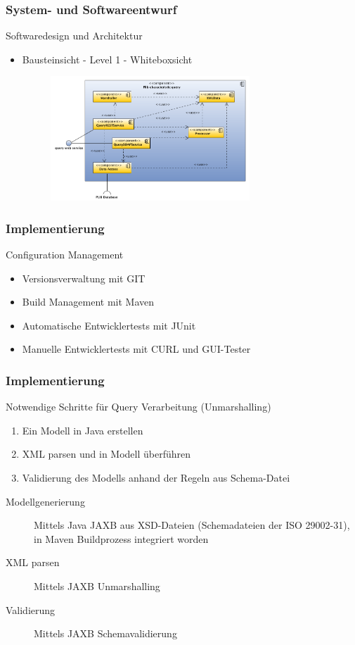 \documentclass[serif,mathserif]{beamer}
\begin{document}
 \begin{frame}
  \frametitle{System- und Softwareentwurf}
  Softwaredesign und Architektur
  \begin{itemize}
  \item Bausteinsicht - Level 1 - Whiteboxsicht 
     \begin{figure}[t]
     \includegraphics[width=7.5cm]{images/bausteinsicht_plib_level1.png}
     \end{figure}
  \end{itemize}
 \end{frame}

\begin{frame}
  \frametitle{Implementierung}
  Configuration Management
  \begin{itemize}
  \item Versionsverwaltung mit GIT
  \item Build Management mit Maven
  \item Automatische Entwicklertests mit JUnit
  \item Manuelle Entwicklertests mit CURL und GUI-Tester
  \end{itemize}
\end{frame}

\begin{frame}
  \frametitle{Implementierung}
  Notwendige Schritte für Query Verarbeitung (Unmarshalling)
  \begin{enumerate}
  \item Ein Modell in Java erstellen
  \item XML parsen und in Modell überführen
  \item Validierung des Modells anhand der Regeln aus Schema-Datei
  \end{enumerate}
  
  \begin{description}
\item[Modellgenerierung] Mittels Java JAXB aus XSD-Dateien (Schemadateien der ISO 29002-31), in Maven Buildprozess integriert worden
\item[XML parsen] Mittels JAXB Unmarshalling 
\item[Validierung] Mittels JAXB Schemavalidierung
\end{description}

\end{frame}
\end{document}

